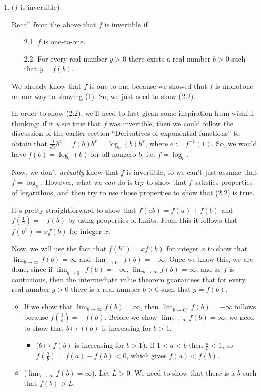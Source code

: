 \begin{enumerate}
    \item ($f$ is invertible).
    
    Recall from the above that $f$ is invertible if
    
    \begin{enumerate}
        \item[2.1.] $f$ is one-to-one.
        \item[2.2.] For every real number $y > 0$ there exists a real number $b > 0$ such that $y = f(b)$.
    \end{enumerate}
    
    We already know that $f$ is one-to-one because we showed that $f$ is monotone on our way to showing (1). So, we just need to show (2.2).
    
    In order to show (2.2), we'll need to first glean some inspiration from wishful thinking: if it \textit{were} true that $f$ was invertible, then we could follow the discussion of the earlier section ``Derivatives of exponential functions'' to obtain that $\frac{d}{dx} b^x = f(b) b^x = \log_e(b) b^x$, where $e := f^{-1}(1)$. So, we would have $f(b) = \log_e(b)$ for all nonzero $b$, i.e. $f = \log_e$.
    
    Now, we don't \textit{actually} know that $f$ is invertible, so we can't just assume that $f = \log_e$. However, what we \textit{can} do is try to show that $f$ satisfies properties of logarithms, and then try to use those properties to show that (2.2) is true.
    
    It's pretty straightforward to show that $f(ab) = f(a) + f(b)$ and $f(\frac{1}{b}) = -f(b)$ by using properties of limits. From this it follows that $f(b^x) = xf(b)$ for integer $x$.
        
    Now, we will use the fact that $f(b^x) = xf(b)$ for integer $x$ to show that $\lim_{b \rightarrow \infty} f(b) = \infty$ and $\lim_{b \rightarrow 0^+} f(b) = -\infty$. Once we know this, we are done, since if $\lim_{b \rightarrow 0^+} f(b) = -\infty$, $\lim_{b \rightarrow \infty} f(b) = \infty$, and as $f$ is continuous, then the intermediate value theorem guarantees that for every real number $y > 0$ there is a real number $b > 0$ such that $y = f(b)$.
    
    \begin{itemize}
        \item If we show that $\lim_{b \rightarrow \infty} f(b) = \infty$, then $\lim_{b \rightarrow 0^+} f(b) = -\infty$ follows because $f(\frac{1}{b}) = -f(b)$. Before we show $\lim_{b \rightarrow \infty} f(b) = \infty$, we need to show that $b \mapsto f(b)$ is increasing for $b > 1$.
        \begin{itemize}
            \item ($b \mapsto f(b)$ is increasing for $b > 1$). If $1 < a < b$ then $\frac{a}{b} < 1$, so $f(\frac{a}{b}) = f(a) - f(b) < 0$, which gives $f(a) < f(b)$.
        \end{itemize}
        \item ($\lim_{b \rightarrow \infty} f(b) = \infty$). Let $L > 0$. We need to show that there is a $b$ such that $f(b) > L$. 
            

\end{itemize}
\end{enumerate}
